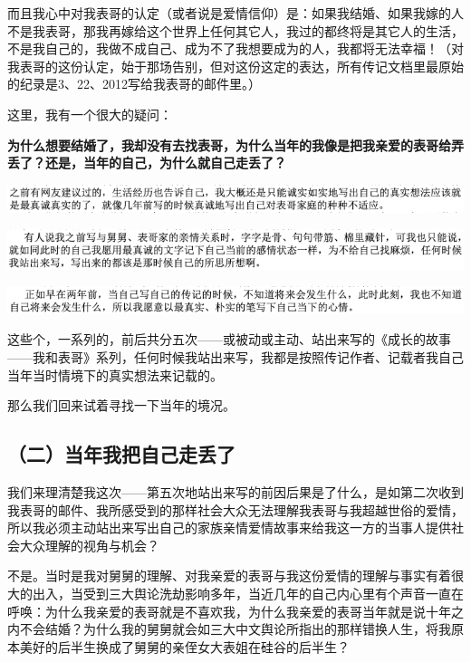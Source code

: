 \documentclass[9pt, b5paper]{article}
\begin{document}
而且我心中对我表哥的认定（或者说是爱情信仰）是：如果我结婚、如果我嫁的人不是我表哥，那我再嫁给这个世界上任何其它人，我过的都终将是其它人的生活，不是我自己的，我做不成自己、成为不了我想要成为的人，我都将无法幸福！（对我表哥的这份认定，始于那场告别，但对这份这定的表达，所有传记文档里最原始的纪录是3、22、2012写给我表哥的邮件里。）

这里，我有一个很大的疑问：

\textbf{为什么想要结婚了，我却没有去找表哥，为什么当年的我像是把我亲爱的表哥给弄丢了？还是，当年的自己，为什么就自己走丢了？}

\begin{center}
\includegraphics[width=.9\linewidth]{./pic/backups_plans_20210426_112108.png}
\end{center}

\begin{center}
\includegraphics[width=.9\linewidth]{./pic/backups_plans_20210426_114722.png}
\end{center}

\begin{center}
\includegraphics[width=.9\linewidth]{./pic/backups_plans_20210426_114834.png}
\end{center}

这些个，一系列的，前后共分五次——或被动或主动、站出来写的《成长的故事——我和表哥》系列，任何时候我站出来写，我都是按照传记作者、记载者我自己当年当时情境下的真实想法来记载的。

那么我们回来试着寻找一下当年的境况。

\subsection{（二）当年我把自己走丢了}
\label{sec:org17681af}

我们来理清楚我这次——第五次地站出来写的前因后果是了什么，是如第二次收到我表哥的邮件、我所感受到的那样社会大众无法理解我表哥与我超越世俗的爱情，所以我必须主动站出来写出自己的家族亲情爱情故事来给我这一方的当事人提供社会大众理解的视角与机会？

不是。当时是我对舅舅的理解、对我亲爱的表哥与我这份爱情的理解与事实有着很大的出入，当受到三大舆论洗劫影响多年，当近几年的自己内心里有个声音一直在呼唤：为什么我亲爱的表哥就是不喜欢我，为什么我亲爱的表哥当年就是说十年之内不会结婚？为什么我的舅舅就会如三大中文舆论所指出的那样错换人生，将我原本美好的后半生换成了舅舅的亲侄女大表姐在硅谷的后半生？
\end{document}
